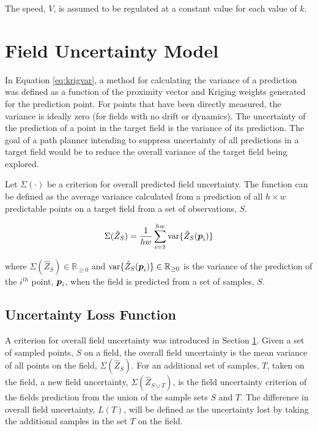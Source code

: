 The speed, $V$, is assumed to be regulated at a constant value for each value of $k$.

\section{Field Uncertainty Model} \label{sec:fielduncert}
In Equation \ref{eq:krigvar}, a method for calculating the variance of a prediction was defined as a function of the proximity vector and Kriging weights generated for the prediction point. For points that have been directly measured, the variance is ideally zero (for fields with no drift or dynamics). The uncertainty of the prediction of a point in the target field is the variance of its prediction. The goal of a path planner intending to suppress uncertainty of all predictions in a target field would be to reduce the overall variance of the target field being explored.

Let $\Sigma(\cdot)$ be a criterion for overall predicted field uncertainty. The function can be defined as the average variance calculated from a prediction of all $h\times w$ predictable points on a target field from a set of observations, $S$.

\begin{equation}
	\Sigma(\hat{Z}_{S}) = \frac{1}{hw}\sum_{i = 1}^{hw} \text{var}\{\hat{Z}_{S}({\it{\boldsymbol{p}}}_i)\}
	\label{eq:fielduncert}
\end{equation}

\noindent where $\Sigma(\hat{Z}_{S}) \in \mathbb{R}_{\geq 0}$ and $\text{var}\{\hat{Z}_{S}({\it{\boldsymbol{p}}}_i)\} \in \mathbb{R}_{\geq 0}$ is the variance of the prediction of the $i^{th}$ point, ${\it{\boldsymbol{p}}}_i$, when the field is predicted from a set of samples, $S$.

\subsection{Uncertainty Loss Function} \label{sec:lossfunc}
A criterion for overall field uncertainty was introduced in Section \ref{sec:fielduncert}. Given a set of sampled points, $S$ on a field, the overall field uncertainty is the mean variance of all points on the field, $\Sigma(\hat{Z}_{S})$. For an additional set of samples, $T$, taken on the field, a new field uncertainty, $\Sigma(\hat{Z}_{S \cup T})$, is the field uncertainty criterion of the fields prediction from the union of the sample sets $S$ and $T$. The difference in overall field uncertainty, $L(T)$, will be defined as the uncertainty lost by taking the additional samples in the set $T$ on the field.

